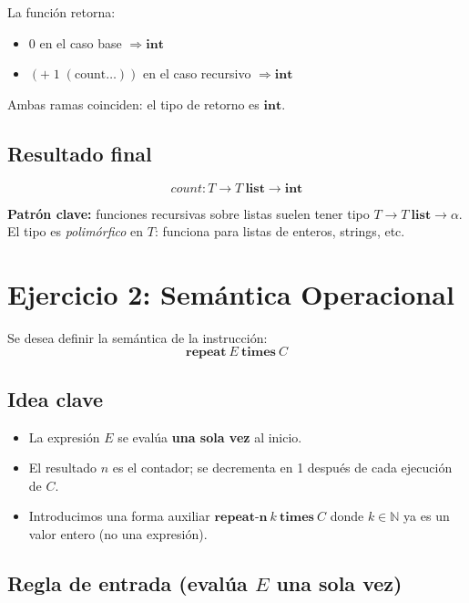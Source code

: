 \documentclass[11pt]{article}
\begin{document}
La función retorna:
\begin{itemize}
    \item $0$ en el caso base $\Rightarrow \mathbf{int}$
    \item $(+ \; 1 \; (\text{count} \ldots))$ en el caso recursivo
          $\Rightarrow \mathbf{int}$
\end{itemize}

Ambas ramas coinciden: el tipo de retorno es $\mathbf{int}$.

\subsection*{Resultado final}

\[
  \boxed{count : T \rightarrow T\ \mathbf{list} \rightarrow \mathbf{int}}
\]

\begin{tcolorbox}
  \textbf{Patrón clave:} funciones recursivas sobre listas suelen tener
  tipo $T \to T\ \mathbf{list} \to \alpha$.
  El tipo es \emph{polimórfico} en $T$: funciona para listas de enteros,
  strings, etc.
\end{tcolorbox}


\section{Ejercicio 2: Semántica Operacional}


Se desea definir la semántica de la instrucción:
\[
  \mathbf{repeat}\ E\ \mathbf{times}\ C
\]

\subsection*{Idea clave}

\begin{itemize}
    \item La expresión $E$ se evalúa \textbf{una sola vez} al inicio.
    \item El resultado $n$ es el contador; se decrementa en 1 después de
          cada ejecución de $C$.
    \item Introducimos una forma auxiliar
          $\mathbf{repeat\text{-}n}\ k\ \mathbf{times}\ C$
          donde $k \in \mathbb{N}$ ya es un valor entero (no una expresión).
\end{itemize}

\subsection*{Regla de entrada (evalúa $E$ una sola vez)}
\end{document}
